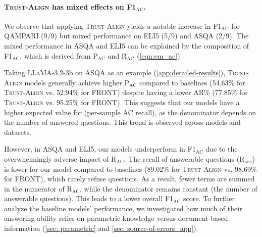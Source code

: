 \documentclass{article} %
\newcommand{\method}[0]{\textsc{Trust-Align}}
\begin{document}
\paragraph{\method{} has mixed effects on F1$_{\text{AC}}$.} \label{sec:worse-em-ac}  
We observe that applying \method{} yields a notable increase in {F1$_{\text{AC}}$} for QAMPARI (9/9) but mixed performance on ELI5 (5/9) and ASQA (2/9). The mixed performance in ASQA and ELI5 can be explained by the composition of {F1$_{\text{AC}}$}, which is derived from {P$_{\text{AC}}$} and {R$_{\text{AC}}$} (\cref{eqn:em_ac}).  

Taking LLaMA-3.2-3b on ASQA as an example (\cref{app:detailed-results}), \method{} models generally achieve higher {P$_{\text{AC}}$} compared to baselines (54.63\% for \method{} vs. 52.94\% for FRONT) despite having a lower AR\% (77.85\% for \method{} vs. 95.25\% for FRONT). This suggests that our models have a higher expected value for  (per-sample AC recall), as the denominator depends on the number of answered questions. This trend is observed across models and datasets. 

However, in ASQA and ELI5, our models underperform in {F1$_{\text{AC}}$} due to the overwhelmingly adverse impact of {R$_{\text{AC}}$}. The recall of answerable questions ($\text{R}_{\text{ans}}$) is lower for our model compared to baselines (89.02\% for \method{} vs. 98.69\% for FRONT), which rarely refuse questions. As a result, fewer terms are summed in the numerator of {R$_{\text{AC}}$}, while the denominator remains constant (the number of answerable questions). This leads to a lower overall {F1$_{\text{AC}}$} score. To further analyze the baseline models' performance, we investigated how much of their answering ability relies on parametric knowledge versus document-based information (\cref{sec: parametric} and \cref{sec: source-of-errors_app}).

\end{document}
